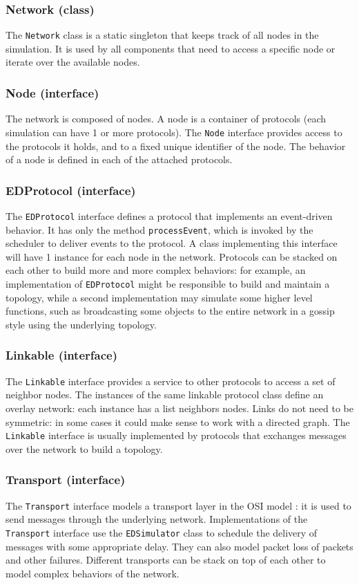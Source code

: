 \subsubsection{Network (class)}
The \texttt{Network} class is a static singleton that keeps track of all nodes in the simulation.
It is used by all components that need to access a specific node or iterate over the available nodes.

\subsubsection{Node (interface)}
The network is composed of nodes.
A node is a container of protocols (each simulation can have \num{1} or more protocols).
The \texttt{Node} interface provides access to the protocols it holds, and to a fixed unique identifier of the node.
The behavior of a node is defined in each of the attached protocols.

\subsubsection{EDProtocol (interface)}
The \texttt{EDProtocol} interface defines a protocol that implements an event-driven behavior.
It has only the method \texttt{processEvent}, which is invoked by the scheduler to deliver events to the protocol.
A class implementing this interface will have \num{1} instance for each node in the network.
Protocols can be stacked on each other to build more and more complex behaviors:
for example, an implementation of \texttt{EDProtocol} might be responsible to build and maintain a topology, while a second implementation may simulate some higher level functions, such as broadcasting some objects to the entire network in a gossip style using the underlying topology.

\subsubsection{Linkable (interface)}
The \texttt{Linkable} interface provides a service to other protocols to access a set of neighbor nodes.
The instances of the same linkable protocol class define an overlay network:
each instance has a list neighbors nodes.
Links do not need to be symmetric:
in some cases it could make sense to work with a directed graph.
The \texttt{Linkable} interface is usually implemented by protocols that exchanges messages over the network to build a topology.

\subsubsection{Transport (interface)}
The \texttt{Transport} interface models a transport layer in the OSI model \cite{wikipedia_osi}:
it is used to send messages through the underlying network.
Implementations of the \texttt{Transport} interface use the \texttt{EDSimulator} class to schedule the delivery of messages with some appropriate delay.
They can also model packet loss of packets and other failures.
Different transports can be stack on top of each other to model complex behaviors of the network.

